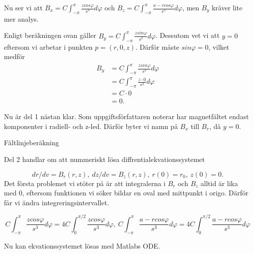 \documentclass[a4paper]{article}
\begin{document}
Nu ser vi att $B_x = C\int_{-\pi}^\pi \frac{zcos\varphi}{s^3}d\varphi$ och $B_z
= C\int_{-\pi}^\pi \frac{a - rcos\varphi}{s^3}d\varphi $, men $B_y$ kräver lite mer analys.

\vspace{1pc}

Enligt beräkningen ovan gäller $B_y = C\int_{-\pi}^\pi
\frac{zsin\varphi}{s^3}d\varphi$. Dessutom vet vi att $y = 0$ eftersom vi
arbetar i punkten $p = (r, 0, z)$. Därför måste $sin\varphi = 0$, vilket medför
\begin{eqnarray*}
  B_y & = C\int_{-\pi}^\pi \frac{zsin\varphi}{s^3}d\varphi \\
      & = C\int_{-\pi}^\pi \frac{z \cdot 0}{s^3}d\varphi \\
      & = C \cdot 0 \\
      & = 0.
\end{eqnarray*}

Nu är del 1 nästan klar. Som uppgiftsförfattaren noterar har magnetfältet endast
komponenter i radiell- och z-led. Därför byter vi namn på $B_x$ till $B_r$, då
$y = 0$.

\clearpage
\centerline{\sc Fältlinjeberäkning}
\vspace{2pc}

Del 2 handlar om att nummeriskt lösa diffrentialekvationssystemet 

$$
dr/dv = B_r(r,z),\ dz/dv = B_z(r, z),\ r(0) = r_0,\ z(0) = 0.
$$
Det första problemet vi stöter på är att integralerna i $B_r$ och $B_z$ alltid
är lika med 0, eftersom funktionen vi söker bildar en oval med mittpunkt i
origo. Därför får vi ändra integreringsintervallet.

$$
C\int_{-\pi}^\pi \frac{zcos\varphi}{s^3}d\varphi = 4C\int_0^{\pi/2}
\frac{zcos\varphi}{s^3}d\varphi, \
C\int_{-\pi}^\pi \frac{a - rcos\varphi}{s^3}d\varphi = 4C\int_0^{\pi/2} \frac{a - rcos\varphi}{s^3}d\varphi 
$$

Nu kan ekvationssystemet lösas med Matlabs ODE.



\end{document}
